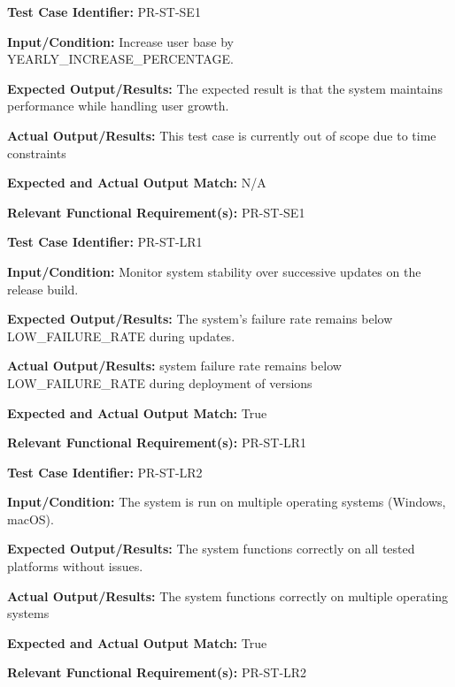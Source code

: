 \documentclass[12pt, titlepage]{article}
\begin{document}
\begin{mdframed}[linewidth=0.5mm]
  \textbf{Test Case Identifier:} PR-ST-SE1 \par
  \textbf{Input/Condition:} Increase user base by \\YEARLY\_INCREASE\_PERCENTAGE. \par
  \textbf{Expected Output/Results:} The expected result is that the system maintains performance while handling user growth. \par
  \textbf{Actual Output/Results:} This test case is currently out of scope due to time constraints\par
  \textbf{Expected and Actual Output Match:} N/A \par
  \textbf{Relevant Functional Requirement(s):} PR-ST-SE1
\end{mdframed}

\begin{mdframed}[linewidth=0.5mm]
  \textbf{Test Case Identifier:} PR-ST-LR1 \par
  \textbf{Input/Condition:} Monitor system stability over successive updates on the release build. \par
  \textbf{Expected Output/Results:} The system’s failure rate remains below \\LOW\_FAILURE\_RATE during updates. \par
  \textbf{Actual Output/Results:} system failure rate remains below \\LOW\_FAILURE\_RATE during deployment of versions \par
  \textbf{Expected and Actual Output Match:} True \par
  \textbf{Relevant Functional Requirement(s):} PR-ST-LR1
\end{mdframed}

\begin{mdframed}[linewidth=0.5mm]
  \textbf{Test Case Identifier:} PR-ST-LR2 \par
  \textbf{Input/Condition:} The system is run on multiple operating systems (Windows, macOS). \par
  \textbf{Expected Output/Results:} The system functions correctly on all tested platforms without issues. \par
  \textbf{Actual Output/Results:} The system functions correctly on multiple operating systems\par
  \textbf{Expected and Actual Output Match:} True \par
  \textbf{Relevant Functional Requirement(s):} PR-ST-LR2
\end{mdframed}
\end{document}
